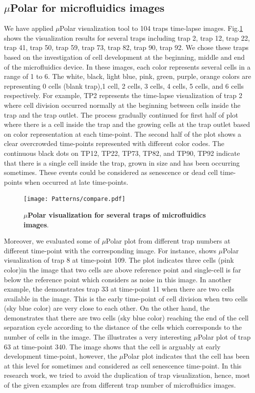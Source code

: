\documentclass[conference]{IEEEtran}
\begin{document}
\subsection{$\mu$Polar for microfluidics images}

We have applied $\mu$Polar visualization tool to 104 traps time-lapse images. Fig.\ref{fig:compare} shows the visualization results for several traps including trap 2, trap 12, trap 22, trap 41, trap 50, trap 59, trap 73, trap 82, trap 90, trap 92. We chose these traps based on the investigation of cell development at the beginning, middle and end of the microfluidics device. In these images, each color represents several cells in a range of 1 to 6. The white, black, light blue, pink, green, purple, orange colors are representing 0 cells (blank trap),1 cell, 2 cells, 3 cells, 4 cells, 5 cells, and 6 cells respectively. For example, TP2 represents the time-lapse visualization of trap 2 where cell division occurred normally at the beginning between cells inside the trap and the trap outlet. The process gradually continued for first half of plot where there is a cell inside the trap and the growing cells at the trap outlet based on color representation at each time-point. The second half of the plot shows a clear overcrowded time-points represented with different color codes. The continuous black dots on TP12, TP22, TP73, TP82, and TP90, TP92 indicate that there is a single cell inside the trap, grown in size and has been occurring sometimes. These events could be considered as senescence or dead cell time-points when occurred at late time-points. 


\begin{figure}
\centering
\texttt{[image: Patterns/compare.pdf]}
\caption{ \textbf{ $\mu$Polar visualization for several traps of microfluidics images}.}
\label{fig:compare}
\end{figure}


Moreover, we evaluated some of $\mu$Polar plot from different trap numbers at different time-point with the corresponding image. For instance,  shows $\mu$Polar visualization of trap 8 at time-point 109. The plot indicates three cells (pink color)in the image that two cells are above reference point and single-cell is far below the reference point which considers as noise in this image. In another example, the  demonstrates trap 33 at time-point 11 when there are two cells available in the image. This is the early time-point of cell division when two cells (sky blue color) are very close to each other. On the other hand, the  demonstrates that there are two cells (sky blue color) reaching the end of the cell separation cycle according to the distance of the cells which corresponds to the number of cells in the image. The  illustrates a very interesting $\mu$Polar plot of trap 63 at time-point 340. The image shows that the cell is arguably at early development time-point, however, the $\mu$Polar plot indicates that the cell has been at this level for sometimes and considered as cell senescence time-point. In this research work, we tried to avoid the duplication of trap visualization, hence, most of the  given examples are from different trap number of microfluidics images.    
\end{document}
